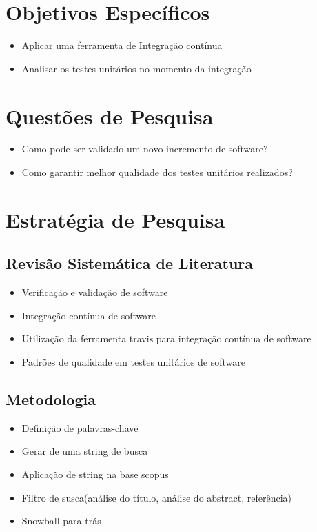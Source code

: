 \section{Objetivos Específicos }
\begin{itemize}
    \item Aplicar uma ferramenta de Integração contínua
    \item Analisar os testes unitários no momento da integração
\end{itemize}
\section{Questões de Pesquisa}
\begin{itemize}
    \item Como pode ser validado um novo incremento de software?
    \item Como garantir melhor qualidade dos testes unitários realizados?
\end{itemize}
\section{Estratégia de Pesquisa}
\subsection{Revisão Sistemática de Literatura}
\begin{itemize}
    \item Verificação e validação de software
    \item Integração contínua de software
    \item  Utilização da ferramenta travis para integração contínua de software
    \item Padrões de qualidade em testes unitários de software
\end{itemize}

\subsection{Metodologia}
\begin{itemize}
    \item Definição de palavras-chave
    \item Gerar de uma string de busca
    \item Aplicação de string na base scopus
    \item Filtro de susca(análise do título, análise do abstract, referência)
    \item Snowball para trás
\end{itemize}

